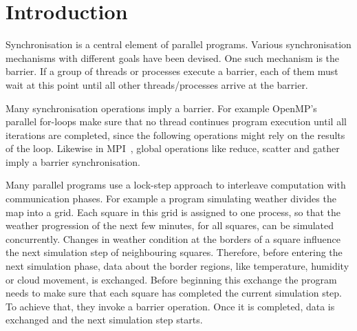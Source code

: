 \documentclass[a4paper, 10pt]{article}
\newcommand*\cleartooddpage{
	\clearpage
	\ifthenelse{\isodd{\thepage}}
		{}
		{\newpage \mbox{} \clearpage}
}
\begin{document}

\cleartooddpage
\section{Introduction}
\label{sec:introduction}
Synchronisation is a central element of parallel programs. Various synchronisation mechanisms with different goals have been devised. One such mechanism is the barrier. If a group of threads or processes execute a barrier, each of them must wait at this point until all other threads/processes arrive at the barrier.

Many synchronisation operations imply a barrier. For example OpenMP's~\cite{openmp} parallel for-loops make sure that no thread continues program execution until all iterations are completed, since the following operations might rely on the results of the loop. Likewise in MPI~\cite{mpiforum}, global operations like reduce, scatter and gather imply a barrier synchronisation.

Many parallel programs use a lock-step approach to interleave computation with communication phases.
For example a program simulating weather divides the map into a grid.
Each square in this grid is assigned to one process, so that the weather progression of the next few minutes, for all squares, can be simulated concurrently.
Changes in weather condition at the borders of a square influence the next simulation step of neighbouring squares.
Therefore, before entering the next simulation phase, data about the border regions, like temperature, humidity or cloud movement, is exchanged.
Before beginning this exchange the program needs to make sure that each square has completed the current simulation step. To achieve that, they invoke a barrier operation.
Once it is completed, data is exchanged and the next simulation step starts.
\end{document}
